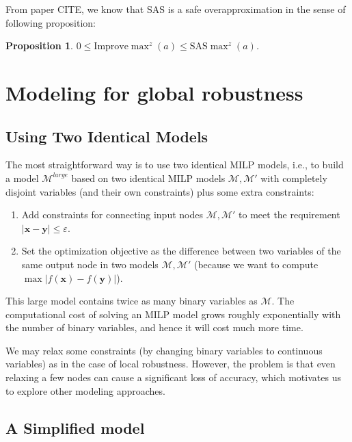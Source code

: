 \documentclass[letterpaper]{article} %
\newtheorem{proposition}{Proposition}
\newcommand{\Improve}{\mathrm{Improve}}
\newcommand{\Utility}{\mathrm{SAS}}
\begin{document}
	From paper CITE, we know that $\Utility$ is a safe overapproximation in the sense of following proposition:
	
	\begin{proposition}
		$0 \leq \Improve\max^z(a) \leq \Utility\max^z(a)$. 
	\end{proposition}
	
	
	
	
	
	
	
	
	
	
	\section{Modeling for global robustness}
	
	
	
	\subsection{Using Two Identical Models}
	The most straightforward way is to use two identical MILP models, i.e., to build a model $\mathcal{M}^{large}$ based on two identical MILP models $\mathcal{M},\mathcal{M}'$ with completely disjoint variables (and their own constraints) plus some extra constraints:
	\begin{enumerate}
		\item Add constraints for connecting input nodes $\mathcal{M},\mathcal{M}'$ to meet the requirement $|\boldsymbol{x}-\boldsymbol{y}| \leq \varepsilon$.
		\item Set the optimization objective as the difference between two variables of the same output node in two models $\mathcal{M},\mathcal{M}'$ (because we want to compute $\max|f(\boldsymbol{x}) -f(\boldsymbol{y}) |$).
	\end{enumerate}
	This large model contains twice as many binary variables as $\mathcal{M}$. The computational cost of solving an MILP model grows roughly exponentially with the number of binary variables, and hence it will cost much more time.
	
	We may relax some constraints (by changing binary variables to continuous variables) as in the case of local robustness. However, the problem is that even relaxing a few nodes can cause a significant loss of accuracy, which motivates us to explore other modeling approaches.
	
	\subsection{A Simplified model}
	
\end{document}
